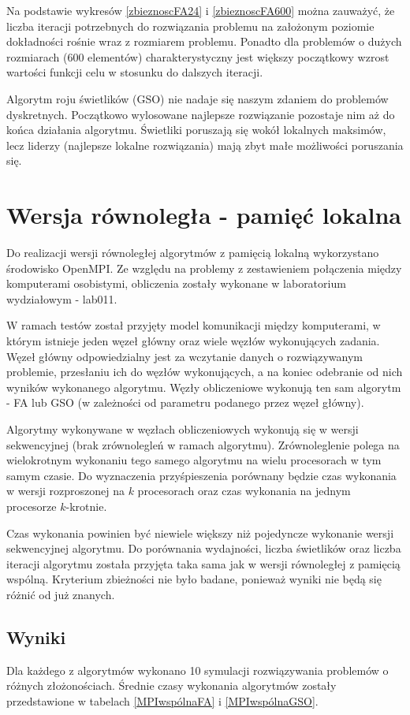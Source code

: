 \documentclass[11pt,a4paper,twoside]{article}
\begin{document}
Na podstawie wykresów \ref{zbieznoscFA24} i \ref{zbieznoscFA600} można zauważyć, że liczba iteracji potrzebnych do rozwiązania problemu na założonym poziomie dokładności rośnie wraz z rozmiarem problemu. Ponadto dla problemów o dużych rozmiarach (600 elementów) charakterystyczny jest większy początkowy wzrost wartości funkcji celu w stosunku do dalszych iteracji.

Algorytm roju świetlików (GSO) nie nadaje się naszym zdaniem do problemów dyskretnych. Początkowo wylosowane najlepsze rozwiązanie pozostaje nim aż do końca działania algorytmu. Świetliki poruszają się wokół lokalnych maksimów, lecz liderzy (najlepsze lokalne rozwiązania) mają zbyt małe możliwości poruszania się.

\section{Wersja równoległa - pamięć lokalna}
Do realizacji wersji równoległej algorytmów z pamięcią lokalną wykorzystano środowisko OpenMPI. Ze względu na problemy z zestawieniem połączenia między komputerami osobistymi, obliczenia zostały wykonane w laboratorium wydziałowym - lab011.

W ramach testów został przyjęty model komunikacji między komputerami, w którym istnieje jeden węzeł główny oraz wiele węzłów wykonujących zadania. Węzeł główny odpowiedzialny jest za wczytanie danych o rozwiązywanym problemie, przesłaniu ich do węzłów wykonujących, a na koniec odebranie od nich wyników wykonanego algorytmu. Węzły obliczeniowe wykonują ten sam algorytm - FA lub GSO (w zależności od parametru podanego przez węzeł główny).

Algorytmy wykonywane w węzłach obliczeniowych wykonują się w wersji sekwencyjnej (brak zrównolegleń w ramach algorytmu). Zrównoleglenie polega na wielokrotnym wykonaniu tego samego algorytmu na wielu procesorach w tym samym czasie. Do wyznaczenia przyśpieszenia porównany będzie czas wykonania w wersji rozproszonej na $k$ procesorach oraz czas wykonania na jednym procesorze $k$-krotnie.

Czas wykonania powinien być niewiele większy niż pojedyncze wykonanie wersji sekwencyjnej algorytmu. Do porównania wydajności, liczba świetlików oraz liczba iteracji algorytmu została przyjęta taka sama jak w wersji równoległej z pamięcią wspólną. Kryterium zbieżności nie było badane, ponieważ wyniki nie będą się różnić od już znanych.

\subsection{Wyniki}
Dla każdego z algorytmów wykonano 10 symulacji rozwiązywania problemów o różnych złożonościach. Średnie czasy wykonania algorytmów zostały przedstawione w tabelach \ref{MPIwspólnaFA} i \ref{MPIwspólnaGSO}.
\end{document}
